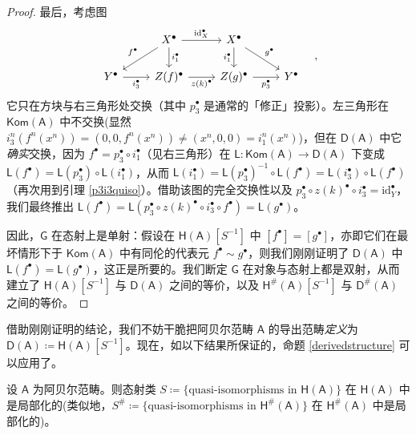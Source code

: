 \begin{proof}
	最后，考虑图
	\[
	\begin{tikzcd}
		& X^\bullet\arrow[r, "\text{id}_X^\bullet"]\arrow[dl, "f^\bullet"']\arrow[d, "i_1^\bullet"] & X^\bullet\arrow[d, "i_1^\bullet"']\arrow[dr, "g^\bullet"] & \\
		Y^\bullet\arrow[r, "i_3^\bullet"'] & Z(f)^\bullet\arrow[r, "z(k)^\bullet"'] & Z(g)^\bullet\arrow[r, "p_3^\bullet"'] & Y^\bullet
	\end{tikzcd}\quad,
	\]
	它只在方块与右三角形处交换（其中 $p_3^\bullet$ 是通常的「修正」投影）。左三角形在 $\mathsf{Kom(A)}$ 中不交换\big(显然 $i_3^n(f^n(x^n))=(0,0,f^n(x^n))\neq(x^n,0,0)=i_1^n(x^n)$\big)，但在 $\mathsf{D(A)}$ 中它\textit{确实}交换，因为 $f^\bullet=p_3^\bullet\circ i_1^\bullet$（见右三角形）在 $\mathsf{L}:\mathsf{Kom(A)}\rightarrow\mathsf{D(A)}$ 下变成 $\mathsf{L}(f^\bullet)=\mathsf{L}(p_3^\bullet)\circ\mathsf{L}(i_1^\bullet)$，从而 $\mathsf{L}(i_1^\bullet)=\mathsf{L}(p_3^\bullet)^{-1}\circ\mathsf{L}(f^\bullet)=\mathsf{L}(i_3^\bullet)\circ\mathsf{L}(f^\bullet)$（再次用到引理 \ref{p3i3quiso}）。借助该图的完全交换性以及 $p_3^\bullet\circ z(k)^\bullet\circ i_3^\bullet=\text{id}_Y^\bullet$，我们最终推出 $\mathsf{L}(f^\bullet)=\mathsf{L}(p_3^\bullet\circ z(k)^\bullet\circ i_3^\bullet\circ f^\bullet)=\mathsf{L}(g^\bullet)$。
	
	因此，$\mathsf{G}$ 在态射上是单射：假设在 $\mathsf{H(A)}[S^{-1}]$ 中 $[f^\bullet]=[g^\bullet]$，亦即它们在最坏情形下于 $\mathsf{Kom(A)}$ 中有同伦的代表元 $f^\bullet\sim g^\bullet$，则我们刚刚证明了 $\mathsf{D(A)}$ 中 $\mathsf{L}(f^\bullet)=\mathsf{L}(g^\bullet)$，这正是所要的。我们断定 $\mathsf{G}$ 在对象与态射上都是双射，从而建立了 $\mathsf{H(A)}[S^{-1}]$ 与 $\mathsf{D(A)}$ 之间的等价，以及 $\mathsf{H^\#\!(A)}[S^{-1}]$ 与 $\mathsf{D^\#\!(A)}$ 之间的等价。
\end{proof}


借助刚刚证明的结论，我们不妨干脆把阿贝尔范畴 $\mathsf{A}$ 的导出范畴\textit{定义}为 $\mathsf{D(A)}\coloneqq\mathsf{H(A)}[S^{-1}]$。现在，如以下结果所保证的，命题 \ref{derivedstructure} 可以应用了。

\begin{Pro}\label{quasilocalizing}
	设 $\mathsf{A}$ 为阿贝尔范畴。则态射类 $S\coloneqq\{\text{quasi-isomorphisms in }\mathsf{H(A)}\}$ 在 $\mathsf{H(A)}$ 中是局部化的\textup(类似地，$S^\#\coloneqq\{\text{quasi-isomorphisms in }\mathsf{H^\#\!(A)}\}$ 在 $\mathsf{H^\#\!(A)}$ 中是局部化的\textup)。 
\end{Pro}   

